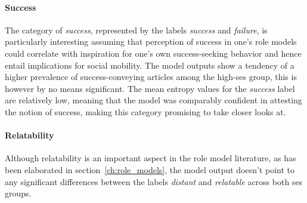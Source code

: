 \paragraph{Success}
The category of \textit{success}, represented by the labels \textit{success} and \textit{failure}, is particularly interesting assuming that perception of success in one's role models could correlate with inspiration for one's own success-seeking behavior and hence entail implications for social mobility. The model outputs show a tendency of a higher prevalence of success-conveying articles among the high-\gls{ses} group, this is however by no means significant. The mean entropy values for the \textit{success} label are relatively low, meaning that the model was comparably confident in attesting the notion of success, making this category promising to take closer looks at.

\paragraph{Relatability}
Although relatability is an important aspect in the role model literature, as has been elaborated in section~\ref{ch:role_models}, the model output doesn't point to any significant differences between the labels \textit{distant} and \textit{relatable} across both \gls{ses} groups.

